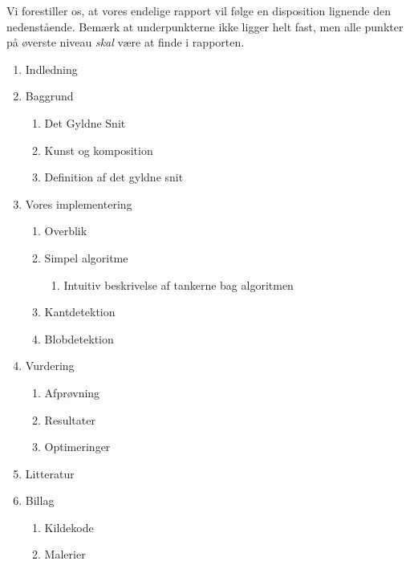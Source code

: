 Vi forestiller os, at vores endelige rapport vil følge en disposition lignende
den nedenstående. Bemærk at underpunkterne ikke ligger helt fast, men alle
punkter på øverste niveau \emph{skal} være at finde i rapporten.

\begin{enumerate}
	\item Indledning
	\item Baggrund
		\begin{enumerate}
			\item Det Gyldne Snit
			\item Kunst og komposition
			\item Definition af det gyldne snit
		\end{enumerate}
	\item Vores implementering
		\begin{enumerate}
			\item Overblik
			\item Simpel algoritme
				\begin{enumerate}
					\item Intuitiv beskrivelse af tankerne bag algoritmen
				\end{enumerate}
			\item Kantdetektion
			\item Blobdetektion
		\end{enumerate}
	\item Vurdering
		\begin{enumerate}
			\item Afprøvning
			\item Resultater
			\item Optimeringer
		\end{enumerate}
	\item Litteratur
	\item Billag
		\begin{enumerate}
			\item Kildekode
			\item Malerier
		\end{enumerate}
\end{enumerate}

